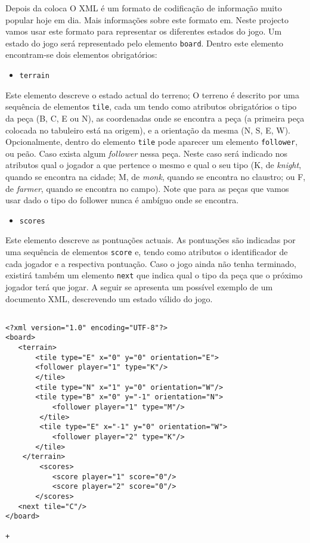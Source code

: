 Depois da coloca
O XML é um formato de codificação de informação muito popular hoje em dia. Mais informações sobre este
formato em. Neste projecto vamos usar este formato para representar os
diferentes estados do jogo. Um estado do jogo será representado pelo elemento \texttt{board}. Dentro este
elemento encontram-se dois elementos obrigatórios:
\begin{itemize}

\item\texttt{terrain}
\end{itemize}
Este elemento descreve o estado actual do terreno; O terreno é descrito por uma sequência de elementos
\texttt{tile}, cada um tendo como atributos obrigatórios o tipo da peça (B, C, E ou N), as coordenadas onde
se encontra a peça (a primeira peça colocada no tabuleiro está na origem), e a orientação da mesma (N, S,
E, W). Opcionalmente, dentro do elemento \texttt{tile} pode aparecer um elemento \texttt{follower}, ou peão.
Caso exista algum \emph{follower} nessa peça. Neste caso será indicado nos atributos qual o jogador a que
pertence o mesmo e qual o seu tipo (K, de \emph{knight}, quando se encontra na cidade; M, de \emph{monk},
quando se encontra no claustro; ou F, de \emph{farmer}, quando se encontra no campo). Note que para as peças
que vamos usar dado o tipo do follower nunca é ambíguo onde se encontra.
\begin{itemize}
\item\texttt{scores}
\end{itemize}
Este elemento descreve as pontuações actuais. As pontuações são indicadas por uma sequência de elementos
\texttt{score} e, tendo como atributos o identificador de cada jogador e a respectiva pontuação. Caso o
jogo ainda não tenha terminado, existirá também um elemento \texttt{next} que indica qual o tipo da peça
que o próximo jogador terá que jogar. A seguir se apresenta um possível exemplo de um documento XML,
descrevendo um estado válido do jogo.
\begin{verbatim}

<?xml version="1.0" encoding="UTF-8"?>
<board>
   <terrain>
       <tile type="E" x="0" y="0" orientation="E">
	   <follower player="1" type="K"/>
       </tile>
       <tile type="N" x="1" y="0" orientation="W"/>
       <tile type="B" x="0" y="-1" orientation="N">
           <follower player="1" type="M"/>
        </tile>
        <tile type="E" x="-1" y="0" orientation="W">
           <follower player="2" type="K"/>
       </tile>
    </terrain>
        <scores>
           <score player="1" score="0"/>
           <score player="2" score="0"/>
       </scores>
   <next tile="C"/>
</board>

+\end{verbatim}


